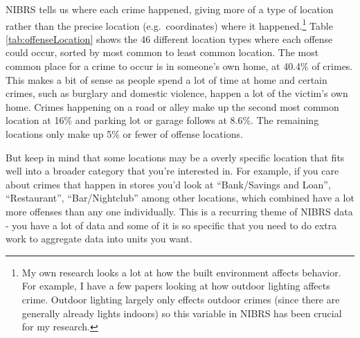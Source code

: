 \documentclass[
  12pt,
  openany]{book}
\begin{document}
NIBRS tells us where each crime happened, giving more of a type of location rather than the precise location (e.g.~coordinates) where it happened.\footnote{My own research looks a lot at how the built environment affects behavior. For example, I have a few papers looking at how outdoor lighting affects crime. Outdoor lighting largely only effects outdoor crimes (since there are generally already lights indoors) so this variable in NIBRS has been crucial for my research.} Table \ref{tab:offenseLocation} shows the 46 different location types where each offense could occur, sorted by most common to least common location. The most common place for a crime to occur is in someone's own home, at 40.4\% of crimes. This makes a bit of sense as people spend a lot of time at home and certain crimes, such as burglary and domestic violence, happen a lot of the victim's own home. Crimes happening on a road or alley make up the second most common location at 16\% and parking lot or garage follows at 8.6\%. The remaining locations only make up 5\% or fewer of offense locations.

But keep in mind that some locations may be a overly specific location that fits well into a broader category that you're interested in. For example, if you care about crimes that happen in stores you'd look at ``Bank/Savings and Loan'', ``Restaurant'', ``Bar/Nightclub'' among other locations, which combined have a lot more offenses than any one individually. This is a recurring theme of NIBRS data - you have a lot of data and some of it is so specific that you need to do extra work to aggregate data into units you want.
\end{document}
